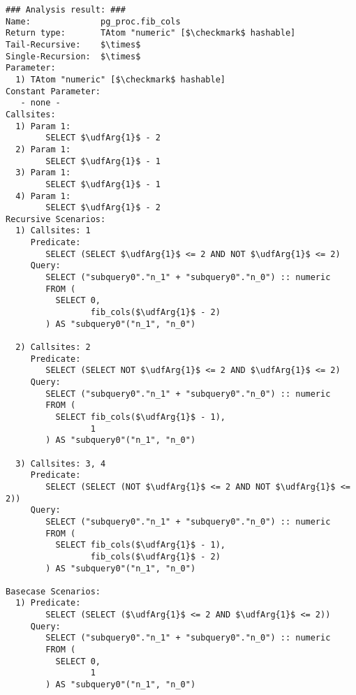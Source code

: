 \begin{lstlisting}[language={},basicstyle=\scriptsize]
### Analysis result: ###
Name:              pg_proc.fib_cols
Return type:       TAtom "numeric" [$\checkmark$ hashable]
Tail-Recursive:    $\times$
Single-Recursion:  $\times$
Parameter:
  1) TAtom "numeric" [$\checkmark$ hashable]
Constant Parameter:
   - none -
Callsites:
  1) Param 1:
        SELECT $\udfArg{1}$ - 2 
  2) Param 1:
        SELECT $\udfArg{1}$ - 1 
  3) Param 1:
        SELECT $\udfArg{1}$ - 1 
  4) Param 1:
        SELECT $\udfArg{1}$ - 2 
Recursive Scenarios:
  1) Callsites: 1
     Predicate:
        SELECT (SELECT $\udfArg{1}$ <= 2 AND NOT $\udfArg{1}$ <= 2) 
     Query:
        SELECT ("subquery0"."n_1" + "subquery0"."n_0") :: numeric
        FROM (
          SELECT 0,
                 fib_cols($\udfArg{1}$ - 2)
        ) AS "subquery0"("n_1", "n_0")

  2) Callsites: 2
     Predicate:
        SELECT (SELECT NOT $\udfArg{1}$ <= 2 AND $\udfArg{1}$ <= 2) 
     Query:
        SELECT ("subquery0"."n_1" + "subquery0"."n_0") :: numeric
        FROM (
          SELECT fib_cols($\udfArg{1}$ - 1), 
                 1
        ) AS "subquery0"("n_1", "n_0")

  3) Callsites: 3, 4
     Predicate:
        SELECT (SELECT (NOT $\udfArg{1}$ <= 2 AND NOT $\udfArg{1}$ <= 2)) 
     Query:
        SELECT ("subquery0"."n_1" + "subquery0"."n_0") :: numeric
        FROM (
          SELECT fib_cols($\udfArg{1}$ - 1), 
                 fib_cols($\udfArg{1}$ - 2)
        ) AS "subquery0"("n_1", "n_0")

Basecase Scenarios:
  1) Predicate:
        SELECT (SELECT ($\udfArg{1}$ <= 2 AND $\udfArg{1}$ <= 2)) 
     Query:
        SELECT ("subquery0"."n_1" + "subquery0"."n_0") :: numeric
        FROM (
          SELECT 0,
                 1
        ) AS "subquery0"("n_1", "n_0")

\end{lstlisting}